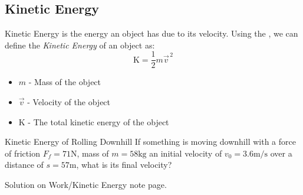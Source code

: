 \subsection{Kinetic Energy} \label{subsec:Kinetic Energy}
\begin{definition} \label{def:Kinetic Energy}
  Kinetic Energy is the energy an object has due to its velocity.
  Using the , we can define the \emph{Kinetic Energy} of an object as:
  \begin{equation} \label{eq:Kinetic Energy}
    \text{K} = \frac{1}{2} m \vec{v}^{\,2}
  \end{equation}
  \begin{itemize}[noitemsep, nolistsep]
    \item $m$ - Mass of the object
    \item $\vec{v}$ - Velocity of the object
    \item $\text{K}$ - The total kinetic energy of the object
  \end{itemize}
\end{definition}

\begin{example}[]{Kinetic Energy of Rolling Downhill}
  If something is moving downhill with a force of friction $F_{f} = 71 \si{\newton}$, mass of $m=58 \si{\kilo \gram}$ an initial velocity of $v_{0} = 3.6 \si{\meter / \second}$ over a distance of $s=57 \si{\meter}$, what is its final velocity?

  \tcblower

  Solution on Work/Kinetic Energy note page.
\end{example}

